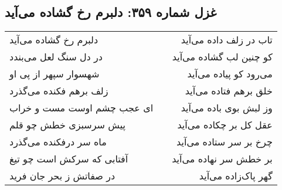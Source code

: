 \begin{center}
\section*{غزل شماره ۳۵۹: دلبرم رخ گشاده می‌آید}
\label{sec:359}
\begin{longtable}{l p{0.5cm} r}
دلبرم رخ گشاده می‌آید
&&
تاب در زلف داده می‌آید
\\
در دل سنگ لعل می‌بندد
&&
کو چنین لب گشاده می‌آید
\\
شهسوار سپهر از پی او
&&
می‌رود کو پیاده می‌آید
\\
زلف برهم فکنده می‌گذرد
&&
خلق برهم فتاده می‌آید
\\
ای عجب چشم اوست مست و خراب
&&
وز لبش بوی باده می‌آید
\\
پیش سرسبزی خطش چو قلم
&&
عقل کل بر چکاده می‌آید
\\
ماه سر درفکنده می‌گذرد
&&
چرخ بر سر ستاده می‌آید
\\
آفتابی که سرکش است چو تیغ
&&
بر خطش سر نهاده می‌آید
\\
در صفاتش ز بحر جان فرید
&&
گهر پاک‌زاده می‌آید
\\
\end{longtable}
\end{center}
